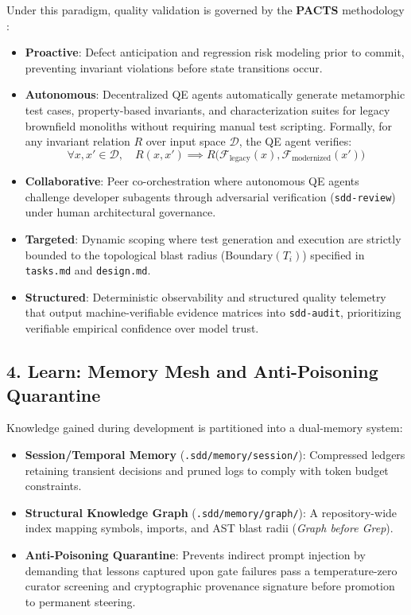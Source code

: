 \documentclass[11pt,a4paper]{article}
\begin{document}
Under this paradigm, quality validation is governed by the \textbf{PACTS} methodology \cite{spiridonov2026agentic,cohen2025pact}:
\begin{itemize}
    \item \textbf{Proactive}: Defect anticipation and regression risk modeling prior to commit, preventing invariant violations before state transitions occur.
    \item \textbf{Autonomous}: Decentralized QE agents automatically generate metamorphic test cases, property-based invariants, and characterization suites for legacy brownfield monoliths without requiring manual test scripting. Formally, for any invariant relation $R$ over input space $\mathcal{D}$, the QE agent verifies:
    \begin{equation}
        \forall x, x' \in \mathcal{D}, \quad R(x, x') \implies R\bigl(\mathcal{F}_{\text{legacy}}(x), \mathcal{F}_{\text{modernized}}(x')\bigr)
    \end{equation}
    \item \textbf{Collaborative}: Peer co-orchestration where autonomous QE agents challenge developer subagents through adversarial verification (\texttt{sdd-review}) under human architectural governance.
    \item \textbf{Targeted}: Dynamic scoping where test generation and execution are strictly bounded to the topological blast radius ($\text{Boundary}(T_i)$) specified in \texttt{tasks.md} and \texttt{design.md}.
    \item \textbf{Structured}: Deterministic observability and structured quality telemetry that output machine-verifiable evidence matrices into \texttt{sdd-audit}, prioritizing verifiable empirical confidence over model trust.
\end{itemize}

\subsection{4. Learn: Memory Mesh and Anti-Poisoning Quarantine}
Knowledge gained during development is partitioned into a dual-memory system:
\begin{itemize}
    \item \textbf{Session/Temporal Memory} (\texttt{.sdd/memory/session/}): Compressed ledgers retaining transient decisions and pruned logs to comply with token budget constraints.
    \item \textbf{Structural Knowledge Graph} (\texttt{.sdd/memory/graph/}): A repository-wide index mapping symbols, imports, and AST blast radii (\textit{Graph before Grep}).
    \item \textbf{Anti-Poisoning Quarantine}: Prevents indirect prompt injection by demanding that lessons captured upon gate failures pass a temperature-zero curator screening and cryptographic provenance signature before promotion to permanent steering.
\end{itemize}
\end{document}
